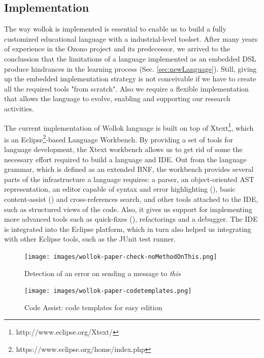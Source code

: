 \subsection{Implementation}
\label{sec:implementation}

The way wollok is implemented is essential to enable us to build a fully customized educational language with a industrial-level toolset.
After many years of experience in the Ozono project and its predecessor, we arrived to the conclussion that
the limitations of a language implemented as an embedded DSL produce hindrances in the learning process (\cf Sec. \ref{sec:newLanguage}).
Still, giving up the embedded implementation strategy is not conceivable if we have to create all the required tools "from scratch".
Also we require a flexible implementation that allows the language to evolve, enabling and supporting our research activities.

The current implementation of Wollok language is built on top of Xtext\footnote{http://www.eclipse.org/Xtext/}, 
which is an Eclipse\footnote{https://www.eclipse.org/home/index.php}-based Language Workbench\cite{fowler2005language}.
By providing a set of tools for language development, the Xtext workbench allows us to get rid of some the necessary effort required to build a language and IDE.
Out from the language grammar, which is defined as an extended BNF, the workbench provides several parts of the infrastructure a language requires: 
a parser, an object-oriented AST representation, 
an editor capable of syntax and error highlighting (), 
basic content-assist () and cross-references search, 
and other tools attached to the IDE, such as structured views of the code.
Also, it gives us support for implementing more advanced tools such as quick-fixes (), refactorings and a debugger.
The IDE is integrated into the Eclipse platform, which in turn also helped us integrating with other Eclipse tools, such as the JUnit test runner.

\begin{figure}[ht]
    \centering
	\texttt{[image: images/wollok-paper-check-noMethodOnThis.png]}
    \caption{Detection of an error on sending a message to \emph{this}}
    \label{fig:check-noMethodOnThis.png}
\end{figure}

\begin{figure}[ht]
    \centering
	\texttt{[image: images/wollok-paper-codetemplates.png]}
    \caption{Code Assist: code templates for easy edition}
    \label{fig:codetemplates.png}
\end{figure}

